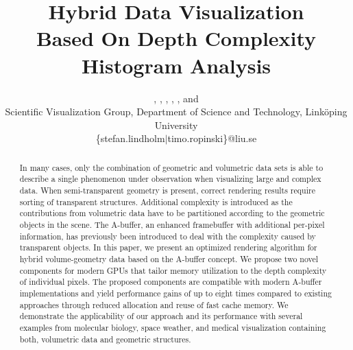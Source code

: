 \documentclass{egpubl}
\title[Hybrid Data Visualization]%
      {Hybrid Data Visualization\\Based On Depth Complexity Histogram Analysis}
\author[S.~Lindholm et al.]%
		{\SL, \MF, \ES, \AB, \AY, and \TR\\%
		Scientific Visualization Group, 
		Department of Science and Technology, 
		Link{\"o}ping University\\%
		\{stefan.lindholm$|$timo.ropinski\}@liu.se}
\newcommand{\ab}{\mbox{A-buffer}}
\newlength{\imgWidth}
\newif\ifSplitBoxFramed
\newcommand{\splitImage}[2]{%
  \begin{tikzpicture}[x=\imgWidth,y=-\imgWidth] %
    \clip (0,0) rectangle (1,1);
    \begin{scope}[]
      \clip (0,0) -- (\topLineRatio,0) -- (\bottomLineRatio,1) -- (0,1);
      \draw(0,0) node[anchor=north west,inner sep=0pt]{%
        \texttt{[image: \#1]}};
    \end{scope}
    \begin{scope}[]
      \clip  (\topLineRatio,0) -- (\bottomLineRatio,1) -- (1,1) -- (1,0);
      \draw(0,0) node[anchor=north west,inner sep=0pt]{%
        \texttt{[image: \#2]}};
    \end{scope}
    \draw[black,very thick] (\topLineRatio,0) -- (\bottomLineRatio,1) ;
    \ifSplitBoxFramed%
      \draw[line width=1pt] (0,0) rectangle (1,1);
    \fi
  \end{tikzpicture}
}
\newcommand{\goldenRatioLong}{0.618}
\newcommand{\goldenRatioShort}{0.382}
\newcommand{\setSplitLineRatios}[2]{%
  \def\topLineRatio{#1}
  \def\bottomLineRatio{#2}
}
\begin{document}
\setSplitLineRatios{\goldenRatioLong}{\goldenRatioShort}


\maketitle

\begin{abstract}
%
In many cases, only the combination of geometric and volumetric data sets is able to describe a single phenomenon under observation when visualizing large and complex data.
When semi-transparent geometry is present, correct rendering results require sorting of transparent structures. 
Additional complexity is introduced as the contributions from volumetric data have to be partitioned according to the geometric objects in the scene.
The \ab{}, an enhanced framebuffer with additional per-pixel information, has previously been introduced to deal with the complexity caused by transparent objects. 
In this paper, we present an optimized rendering algorithm for hybrid volume-geometry data based on the \ab{} concept. 
We propose two novel components for modern GPUs that tailor memory utilization to the depth complexity of individual pixels.
The proposed components are compatible with modern \ab{} implementations and yield performance gains of up to eight times compared to existing approaches through reduced allocation and reuse of fast cache memory. 
%
We demonstrate the applicability of our approach and its performance with several examples from molecular biology, space weather, and medical visualization containing both, volumetric data and geometric structures.

\begin{classification} %
\end{classification}

\end{abstract}
\end{document}

